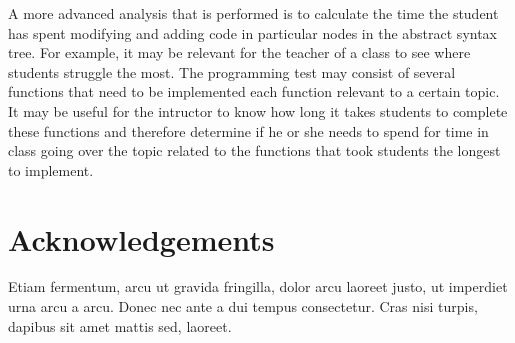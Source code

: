 \documentclass[a1,portrait]{a0poster}
\begin{document}
\begin{multicols}{2}
A more advanced analysis that is performed is to calculate the time the student
has spent modifying and adding code in particular nodes in the abstract syntax
tree. For example, it may be relevant for the teacher of a class to see where
students struggle the most. The programming test may consist of several
functions that need to be implemented each function relevant to a certain
topic. It may be useful for the intructor to know how long it takes students to
complete these functions and therefore determine if he or she needs to spend
for time in class going over the topic related to the functions that took
students the longest to implement.



{\small
\nocite{*} %
}


\section*{Acknowledgements}

Etiam fermentum, arcu ut gravida fringilla, dolor arcu laoreet justo, ut imperdiet urna arcu a arcu. Donec nec ante a dui tempus consectetur. Cras nisi turpis, dapibus sit amet mattis sed, laoreet.


\end{multicols}
\end{document}

